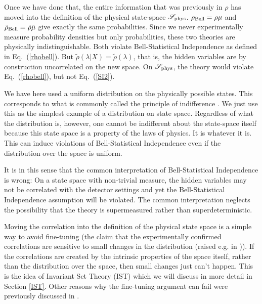 \documentclass{article}
\begin{document}
Once we have done that, the entire information that was previously in $\rho$ has moved into the definition of the physical state-space ${\mathscr S}_{\rm phys}$. 
$\rho_{\rm Bell} = \rho \mu$ and $\tilde \rho_{\rm Bell} = \tilde \rho \tilde \mu$ give exactly the same probabilities. Since we never experimentally measure probability densities but only probabilities, these two theories are physically indistinguishable. Both violate Bell-Statistical Independence as defined in Eq.\ (\ref{rhobell}). But $\tilde \rho(\lambda |X ) = \tilde \rho(\lambda)$, that is, the hidden variables are by construction uncorrelated on the new space. On ${\mathscr S}_{\rm phys}$, the theory would violate Eq.\ (\ref{rhobell}), but not Eq.\ (\ref{SI2}). 

We have here used a uniform distribution on the physically possible states. This corresponds to what is commonly called the principle of indifference \mbox{\cite{keynes1921treatise}}. We just use this as the simplest example of a distribution on state space. Regardless of what the distribution is, however, one cannot be indifferent about the state-space itself because this state space is a property of the laws of physics. It is whatever it is. This can induce violations of Bell-Statistical Independence even if the distribution over the space is uniform.

It is in this sense that the common interpretation of Bell-Statistical Independence is wrong: On a state space with non-trivial measure, the hidden variables may not be correlated with the detector settings and yet the Bell-Statistical Independence assumption will be violated. The common interpretation neglects the possibility that the theory is supermeasured rather than superdeterministic.

Moving the correlation into the definition of the physical state space is a simple way to avoid fine-tuning (the claim that the experimentally confirmed correlations are sensitive to small changes in the distribution (raised e.g. in \cite{Sen2020Superdet2,Wood2015FineTuning})). If the correlations are created by the intrinsic properties of the space itself, rather than the distribution over the space, then small changes just can't happen. This is the idea of Invariant Set Theory ({\sc IST}) \cite{Palmer2020Discretization} which we will discuss in more detail in Section \ref{IST}. Other reasons why the fine-tuning argument can fail were previously discussed in \cite{Hossenfelder2020SuperdeterminismGuide,Wharton2019Reformulations,Donadi2020SuperdetToy}.
\end{document}
